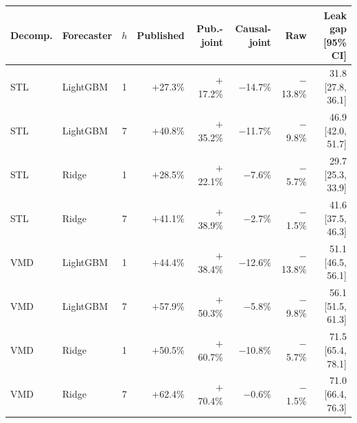 \begin{tabular}{llcrrrrr}
\toprule
Decomp. & Forecaster & $h$ & Published & Pub.-joint & Causal-joint & Raw & Leak gap [95\% CI]\\
\midrule
STL & LightGBM & 1 & $+$27.3\% & $+$17.2\% & $-$14.7\% & $-$13.8\% & 31.8 [27.8, 36.1]\\
STL & LightGBM & 7 & $+$40.8\% & $+$35.2\% & $-$11.7\% & $-$9.8\% & 46.9 [42.0, 51.7]\\
STL & Ridge & 1 & $+$28.5\% & $+$22.1\% & $-$7.6\% & $-$5.7\% & 29.7 [25.3, 33.9]\\
STL & Ridge & 7 & $+$41.1\% & $+$38.9\% & $-$2.7\% & $-$1.5\% & 41.6 [37.5, 46.3]\\
VMD & LightGBM & 1 & $+$44.4\% & $+$38.4\% & $-$12.6\% & $-$13.8\% & 51.1 [46.5, 56.1]\\
VMD & LightGBM & 7 & $+$57.9\% & $+$50.3\% & $-$5.8\% & $-$9.8\% & 56.1 [51.5, 61.3]\\
VMD & Ridge & 1 & $+$50.5\% & $+$60.7\% & $-$10.8\% & $-$5.7\% & 71.5 [65.4, 78.1]\\
VMD & Ridge & 7 & $+$62.4\% & $+$70.4\% & $-$0.6\% & $-$1.5\% & 71.0 [66.4, 76.3]\\
\bottomrule
\end{tabular}